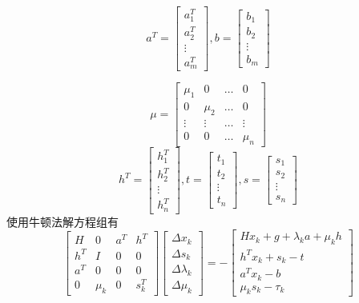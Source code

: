 \begin{equation}
	a^T=
	\begin{bmatrix}
		a_1^T \\
		a_2^T \\
		\vdots \\
		a_m^T 
	\end{bmatrix}
	,
	b=
	\begin{bmatrix}
		b_1 \\
		b_2 \\
		\vdots \\
		b_m 
	\end{bmatrix}
\end{equation}

\begin{equation}
	\mu=
	\begin{bmatrix}
		\mu_1 & 0 & \ldots & 0 \\
		0 & \mu_2 & \ldots & 0 \\
		\vdots & \vdots & \ldots & \vdots \\
		0 & 0 & \ldots & \mu_n
	\end{bmatrix}
\end{equation}
\begin{equation}
	h^T=
	\begin{bmatrix}
		h_1^T \\
		h_2^T \\
		\vdots \\
		h_n^T 
	\end{bmatrix}
	,
	t=
	\begin{bmatrix}
		t_1 \\
		t_2 \\
		\vdots \\
		t_n 
	\end{bmatrix}
	,
	s=
	\begin{bmatrix}
		s_1 \\
		s_2 \\
		\vdots \\
		s_n 
	\end{bmatrix}
\end{equation}
使用牛顿法解方程组有
\begin{equation}
	\begin{bmatrix}
		H & 0 & a^T & h^T \\
		h^T & I & 0 & 0 \\
		a^T & 0 & 0 & 0 \\
		0 & \mu_k & 0 & s_k^T 
	\end{bmatrix}
	\begin{bmatrix}
		\Delta x_k \\
		\Delta s_k \\
		\Delta \lambda_k \\
		\Delta \mu_k 
	\end{bmatrix}
	= -
	\begin{bmatrix}
		Hx_k+g+\lambda_k a + \mu_k h \\
		h^Tx_k+s_k-t \\
		a^Tx_k - b \\
		\mu_ks_k - \tau_k 
	\end{bmatrix}
\end{equation}
